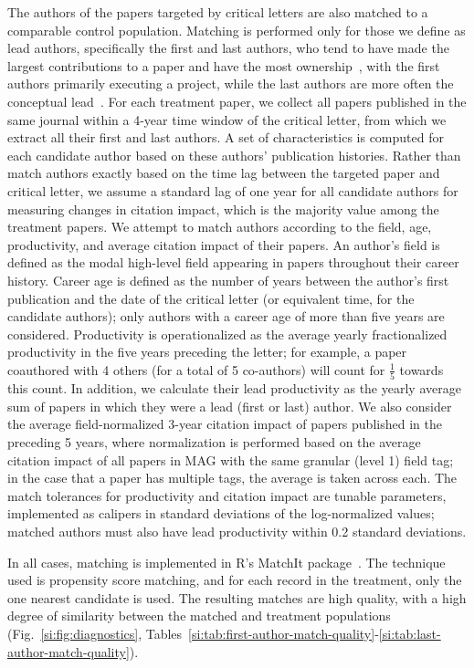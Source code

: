 \documentclass[12pt,a4paper]{article}
\numberwithin{equation}{section}
\begin{document}
The authors of the papers targeted by critical letters are also matched to a comparable control population. 
Matching is performed only for those we define as lead authors, specifically the first and last authors, who tend to have made the largest contributions to a paper and have the most ownership~\cite{lariviere_2016_division}, with the first authors primarily executing a project, while the last authors are more often the conceptual lead~\cite{lariviere_2021_division}.
For each treatment paper, we collect all papers published in the same journal within a 4-year time window of the critical letter, from which we extract all their first and last authors.
A set of characteristics is computed for each candidate author based on these authors' publication histories.
Rather than match authors exactly based on the time lag between the targeted paper and critical letter, we assume a standard lag of one year for all candidate authors for measuring changes in citation impact, which is the majority value among the treatment papers. 
We attempt to match authors according to the field, age, productivity, and average citation impact of their papers. 
An author's field is defined as the modal high-level field appearing in papers throughout their career history. 
Career age is defined as the number of years between the author's first publication and the date of the critical letter (or equivalent time, for the candidate authors); only authors with a career age of more than five years are considered.
Productivity is operationalized as the average yearly fractionalized productivity in the five years preceding the letter; for example, a paper coauthored with 4 others (for a total of 5 co-authors) will count for $\frac{1}{5}$ towards this count. 
In addition, we calculate their lead productivity as the yearly average sum of papers in which they were a lead (first or last) author. 
We also consider the average field-normalized 3-year citation impact of papers published in the preceding 5 years, where normalization is performed based on the average citation impact of all papers in MAG with the same granular (level 1) field tag; in the case that a paper has multiple tags, the average is taken across each. 
The match tolerances for productivity and citation impact are tunable parameters, implemented as calipers in standard deviations of the log-normalized values; matched authors must also have lead productivity within 0.2 standard deviations. 

In all cases, matching is implemented in R's MatchIt package~\cite{matchit_2011}. 
The technique used is propensity score matching, and for each record in the treatment, only the one nearest candidate is used.
The resulting matches are high quality, with a high degree of similarity between the matched and treatment populations (Fig.~\ref*{si:fig:diagnostics}, Tables~\ref*{si:tab:first-author-match-quality}-\ref*{si:tab:last-author-match-quality}).
\end{document}

